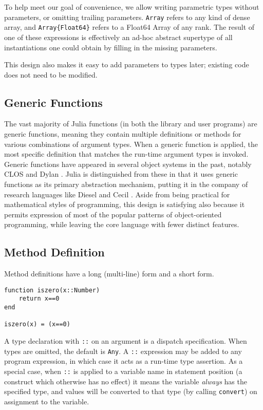 \documentclass[9pt]{sigplanconf}
\begin{document}
To help meet our goal of convenience, we allow writing
parametric types without parameters, or omitting trailing parameters.
{\tt Array} refers to any kind of dense array, and {\tt Array\{Float64\}}
refers to a Float64 Array of any rank.
The result of one of these expressions is effectively an ad-hoc abstract
supertype of all instantiations one could obtain by filling in the missing
parameters.

This design also makes it easy to add parameters to types later; existing
code does not need to be modified.


\subsection{Generic Functions}

The vast majority of Julia functions (in both the library and user programs)
are generic functions, meaning they contain multiple definitions or methods for
various combinations of argument types. When a generic function is applied,
the most specific definition that matches the run-time argument types is
invoked. Generic functions have appeared in several object systems in the past,
notably CLOS \cite{closoverview} and Dylan \cite{dylanlang}.
Julia is distinguished from these in that
it uses generic functions as its primary abstraction mechanism, putting it in
the company of research languages like Diesel \cite{dieselspec} and Cecil
\cite{cecil}. Aside
from being practical for mathematical styles of programming,
this design is satisfying also because it permits
expression of most of the popular patterns of object-oriented programming,
while leaving the core language with fewer distinct features.

\subsection{Method Definition}
Method definitions have a long (multi-line) form and a short form.

\begin{verbatim}
function iszero(x::Number)
    return x==0
end

iszero(x) = (x==0)
\end{verbatim}

A type declaration with {\tt ::} on an argument is a dispatch specification.
When types are omitted, the default is {\tt Any}.
A {\tt ::} expression may be added to any program expression, in which case
it acts as a run-time type assertion. As a special case, when {\tt ::} is
applied to a variable name in statement position (a construct which otherwise
has no effect) it means the variable \emph{always} has the specified type,
and values will be converted to that type (by calling {\tt convert}) on
assignment to the variable.
\end{document}
